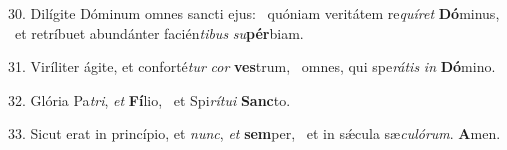 30. Dilígite Dóminum omnes sancti ejus: \dag\  quóniam veritátem re\textit{quí}\textit{ret} \textbf{Dó}minus, \ast\  et retríbuet abundánter facién\textit{ti}\textit{bus} \textit{su}\textbf{pér}biam.\

31. Viríliter ágite, et conforté\textit{tur} \textit{cor} \textbf{ves}trum, \ast\  omnes, qui spe\textit{rá}\textit{tis} \textit{in} \textbf{Dó}mino.\

32. Glória Pa\textit{tri}, \textit{et} \textbf{Fí}lio, \ast\  et Spi\textit{rí}\textit{tu}\textit{i} \textbf{Sanc}to.\

33. Sicut erat in princípio, et \textit{nunc}, \textit{et} \textbf{sem}per, \ast\  et in sǽcula sæ\textit{cu}\textit{ló}\textit{rum}. \textbf{A}men.\


